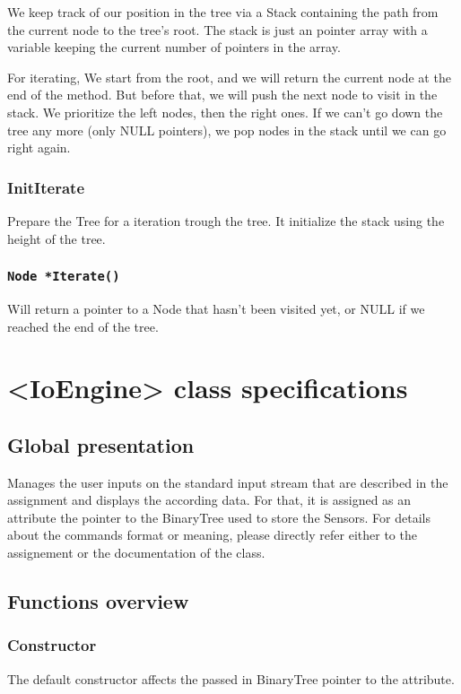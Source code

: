\documentclass[10pt]{article}
\begin{document}
We keep track of our position in the tree via a Stack containing the path from the current node to the tree's root. The stack is just an pointer array with a variable keeping the current number of pointers in the array.

For iterating, We start from the root, and we will return the current node at the end of the method. But before that, we will push the next node to visit in the stack. We prioritize the left nodes, then the right ones. If we can't go down the tree any more (only NULL pointers), we pop nodes in the stack until we can go right again.

\subsubsection*{InitIterate}
Prepare the Tree for a iteration trough the tree. It initialize the stack using the height of the tree.

\subsubsection*{\tt Node *Iterate()}
Will return a pointer to a Node that hasn't been visited yet, or NULL if we reached the end of the tree.

\section{<IoEngine> class specifications}
\subsection{Global presentation}
Manages the user inputs on the standard input stream that are described in the assignment and displays the according data. For that, it is assigned as an attribute the pointer to the BinaryTree used to store the Sensors. For details about the commands format or meaning, please directly refer either to the assignement or the documentation of the class.

\subsection{Functions overview}

\subsubsection*{Constructor}
The default constructor affects the passed in BinaryTree pointer to the attribute.
\end{document}
